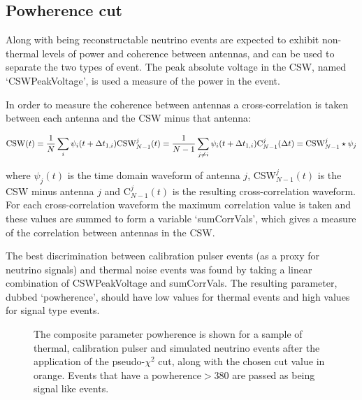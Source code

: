 \subsection{Powherence cut}
\label{sec:Analysis:Thermal-Cuts:Powherence}

Along with being reconstructable neutrino events are expected to exhibit non-thermal levels of power and coherence between antennas, and can be used to separate the two types of event. The peak absolute voltage in the CSW, named `CSWPeakVoltage', is used a measure of the power in the event. 

In order to measure the coherence between antennas a cross-correlation is taken between each antenna and the CSW minus that antenna:

\begin{equation}
  \mbox{CSW}(t) = \frac{1}{N}\sum_{i} \psi_{i}(t+\Delta t_{1,i})\\
  \mbox{CSW}_{N-1}^{j}(t) = \frac{1}{N-1}\sum_{j \neq i} \psi_{i}(t+\Delta t_{1,i})\\
  \mbox{C}_{N-1}^{j}(\Delta t) = {\mbox{CSW}_{N-1}^{j} \star \psi_{j}}
\end{equation}

\noindent where $\psi_{j}(t)$ is the time domain waveform of antenna $j$, CSW$_{N-1}^{j}(t)$ is the CSW minus antenna $j$ and C$_{N-1}^{j}(t)$ is the resulting cross-correlation waveform. For each cross-correlation waveform the maximum correlation value is taken and these values are summed to form a variable `sumCorrVals', which gives a measure of the correlation between antennas in the CSW.

The best discrimination between calibration pulser events (as a proxy for neutrino signals) and thermal noise events was found by taking a linear combination of CSWPeakVoltage and sumCorrVals. The resulting parameter, dubbed `powherence', should have low values for thermal events and high values for signal type events.


\begin{figure}[htpb]
  \hfill
  \caption{The composite parameter powherence is shown for a sample of thermal, calibration pulser and simulated neutrino events after the application of the pseudo-$\chi^{2}$ cut, along with the chosen cut value in orange. Events that have a $\mbox{powherence} > 380$ are passed as being signal like events.}
  \label{fig:Analysis:Thermal-Cuts:Powherence}
\end{figure}

